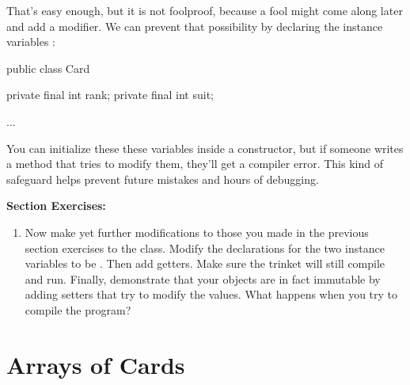 
That's easy enough, but it is not foolproof, because a fool might come along later and add a modifier.
We can prevent that possibility by declaring the instance variables :

\begin{code}
public class Card {
    private final int rank;
    private final int suit;

    ...
}
\end{code}

You can initialize these these variables inside a constructor,
but if someone writes a method that tries to modify them, they'll get a compiler error.
This kind of safeguard helps prevent future mistakes and hours of debugging.

\textbf{Section Exercises:}
\begin{enumerate}
\item Now make yet further modifications to those you made in the previous section exercises to the  class.  Modify the declarations for the two instance variables to be .  Then add getters.  Make sure the trinket will still compile and run.  Finally, demonstrate that your  objects are in fact immutable by adding setters that try to modify the values.  What happens when you try to compile the program?
\end{enumerate}

\section{Arrays of Cards}
\label{cardarray}




